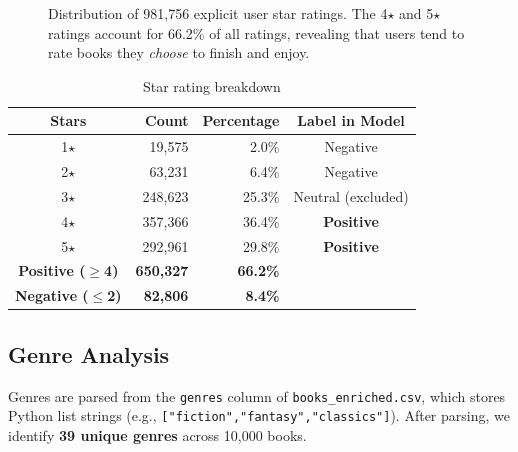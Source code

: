 \documentclass[12pt, a4paper]{article}
\newcommand{\code}[1]{\texttt{\small\color{shelfPurple}#1}}
\begin{document}
\begin{figure}[H]
\centering
{}
\caption{Distribution of 981{,}756 explicit user star ratings. The 4$\star$ and 5$\star$
ratings account for 66.2\% of all ratings, revealing that users tend to rate books they
\emph{choose} to finish and enjoy.}
\end{figure}

\begin{table}[H]
\centering
\caption{Star rating breakdown}
\begin{tabular}{@{}crrc@{}}
\toprule
\textbf{Stars} & \textbf{Count} & \textbf{Percentage} & \textbf{Label in Model} \\
\midrule
1$\star$ & 19{,}575 & 2.0\% & Negative \\
2$\star$ & 63{,}231 & 6.4\% & Negative \\
3$\star$ & 248{,}623 & 25.3\% & Neutral (excluded) \\
4$\star$ & 357{,}366 & 36.4\% & \textbf{Positive} \\
5$\star$ & 292{,}961 & 29.8\% & \textbf{Positive} \\
\midrule
\textbf{Positive ($\geq$4)} & \textbf{650{,}327} & \textbf{66.2\%} & \\
\textbf{Negative ($\leq$2)} & \textbf{82{,}806} & \textbf{8.4\%} & \\
\bottomrule
\end{tabular}
\end{table}

\subsection{Genre Analysis}

Genres are parsed from the \code{genres} column of \code{books\_enriched.csv},
which stores Python list strings (e.g., \code{["fiction","fantasy","classics"]}).
After parsing, we identify \textbf{39 unique genres} across 10{,}000 books.
\end{document}
